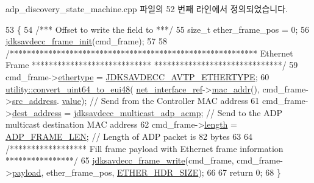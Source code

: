 adp\+\_\+discovery\+\_\+state\+\_\+machine.\+cpp 파일의 52 번째 라인에서 정의되었습니다.


\begin{DoxyCode}
53 \{
54     \textcolor{comment}{/*** Offset to write the field to ***/}
55     \textcolor{keywordtype}{size\_t} ether\_frame\_pos = 0;
56     \hyperlink{group__frame_ga14d8effbd6816c69743c5be3e98fea27}{jdksavdecc\_frame\_init}(cmd\_frame);
57 
58     \textcolor{comment}{/********************************************************** Ethernet Frame ****************************
      ******************************/}
59     cmd\_frame->\hyperlink{structjdksavdecc__frame_aa9296c58dc24c63c4ee927db394a97d7}{ethertype} = \hyperlink{group__pdu_ga9fe7bd6b7d7b0f92f5fdbb910068197f}{JDKSAVDECC\_AVTP\_ETHERTYPE};
60     \hyperlink{namespaceavdecc__lib_1_1utility_a723fa51b0a25cbec764d4e7fa1f5daac}{utility::convert\_uint64\_to\_eui48}(
      \hyperlink{namespaceavdecc__lib_adb4da03bc65b7846cc240ee919bbde19}{net\_interface\_ref}->\hyperlink{classavdecc__lib_1_1net__interface__imp_a742e975c065f9067f42182847df080da}{mac\_addr}(), cmd\_frame->\hyperlink{structjdksavdecc__frame_a74855d22d112da72f29ba4959ebc639b}{src\_address}.
      \hyperlink{structjdksavdecc__eui48_a18b93f04637cf37688ec10a33a0cbc26}{value}); \textcolor{comment}{// Send from the Controller MAC address}
61     cmd\_frame->\hyperlink{structjdksavdecc__frame_a104d37031c593f66765dc66d8ac8962b}{dest\_address} = \hyperlink{group__pdu_ga151652dc8a9ab46279afe5930fe815d5}{jdksavdecc\_multicast\_adp\_acmp};      
                                       \textcolor{comment}{// Send to the ADP multicast destination MAC address}
62     cmd\_frame->\hyperlink{structjdksavdecc__frame_a1892eba2086d12ac2b09005aeb09ea3b}{length} = \hyperlink{namespaceavdecc__lib_a2b5e266e2064669372f6c59e977c6c88a501d4a1d733ed27e4010c3dd55b67909}{ADP\_FRAME\_LEN};                                                  
                 \textcolor{comment}{// Length of ADP packet is 82 bytes}
63 
64     \textcolor{comment}{/****************** Fill frame payload with Ethernet frame information ****************/}
65     \hyperlink{group__frame_gaba1e860c060886e82198907b17214aee}{jdksavdecc\_frame\_write}(cmd\_frame, cmd\_frame->\hyperlink{structjdksavdecc__frame_a220ad076814a31ae0163e722e523de46}{payload}, ether\_frame\_pos, 
      \hyperlink{namespaceavdecc__lib_a6c827b1a0d973e18119c5e3da518e65ca9512ad9b34302ba7048d88197e0a2dc0}{ETHER\_HDR\_SIZE});
66 
67     \textcolor{keywordflow}{return} 0;
68 \}
\end{DoxyCode}


